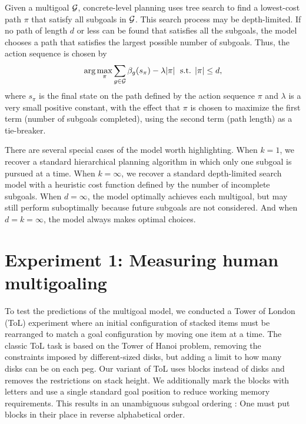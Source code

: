 \documentclass[10pt,letterpaper]{article}
\begin{document}
Given a multigoal $\mathcal{G}$, concrete-level planning uses tree search to find a lowest-cost path $\pi$ that satisfy all subgoals in $\mathcal{G}$. This search process may be depth-limited. If no path of length $d$ or less can be found that satisfies all the subgoals, the model chooses a path that satisfies the largest possible number of subgoals. Thus, the action sequence is chosen by
%
\begin{equation}\label{eq:concrete}
  \arg\max_\pi 
    \sum_{g \in \mathcal{G}} \beta_g(s_\pi) - \lambda |\pi |
    \; \text{ s.t.  } |\pi| \leq d,
\end{equation}
%
where $s_\pi$ is the final state on the path defined by the action sequence $\pi$ and $\lambda$ is a very small positive constant, with the effect that $\pi$ is chosen to maximize the first term (number of subgoals completed), using the second term (path length) as a tie-breaker.

There are several special cases of the model worth highlighting. When $k = 1$, we recover a standard hierarchical planning algorithm in which only one subgoal is pursued at a time. When $k = \infty$, we recover a standard depth-limited search model with a heuristic cost function defined by the number of incomplete subgoals. When $d = \infty$, the model optimally achieves each multigoal, but may still perform suboptimally because future subgoals are not considered. And when $d = k = \infty$, the model always makes optimal choices.


\section{Experiment 1: Measuring human multigoaling}

To test the predictions of the multigoal model, we conducted a Tower of London (ToL) experiment \citep{Shallice1982} where an initial configuration of stacked items must be rearranged to match a goal configuration by moving one item at a time. The classic ToL task is based on the Tower of Hanoi problem, removing the constraints imposed by different-sized disks, but adding a limit to how many disks can be on each peg. Our variant of ToL uses blocks instead of disks and removes the restrictions on stack height. We additionally mark the blocks with letters and use a single standard goal position to reduce working memory requirements. This results in an unambiguous subgoal ordering \citep{Kaller2011}: One must put blocks in their place in reverse alphabetical order.
\end{document}
